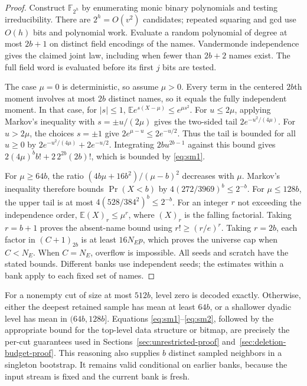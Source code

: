 \documentclass[11pt,letterpaper]{article}
\numberwithin{equation}{section}
\newcommand{\E}{\mathbb E}
\begin{document}
\begin{proof}
Construct $\mathbb F_{2^h}$ by enumerating monic binary polynomials and testing irreducibility.
There are $2^h=O(v^2)$ candidates; repeated squaring and gcd use $O(h)$ bits and polynomial work.
Evaluate a random polynomial of degree at most $2b+1$ on distinct field encodings of the names.
Vandermonde independence gives the claimed joint law, including when fewer than $2b+2$ names exist.
The full field word is evaluated before its first $j$ bits are tested.

The case $\mu=0$ is deterministic, so assume $\mu>0$.
Every term in the centered $2b$th moment involves at most $2b$ distinct names, so it equals the fully independent moment.
In that case, for $|s|\le1$, $\E e^{s(X-\mu)}\le e^{\mu s^2}$.
For $u\le2\mu$, applying Markov's inequality with $s=\pm u/(2\mu)$ gives the two-sided tail $2e^{-u^2/(4\mu)}$.
For $u>2\mu$, the choices $s=\pm1$ give $2e^{\mu-u}\le2e^{-u/2}$.
Thus the tail is bounded for all $u\ge0$ by $2e^{-u^2/(4\mu)}+2e^{-u/2}$.
Integrating $2b u^{2b-1}$ against this bound gives $2(4\mu)^b b!+2\,2^{2b}(2b)!$, which is bounded by \eqref{eq:sm1}.

For $\mu\ge64b$, the ratio $(4b\mu+16b^2)/(\mu-b)^2$ decreases with $\mu$.
Markov's inequality therefore bounds $\Pr(X<b)$ by $4(272/3969)^b\le2^{-b}$.
For $\mu\le128b$, the upper tail is at most $4(528/384^2)^b\le2^{-b}$.
For an integer $r$ not exceeding the independence order, $\E(X)_r\le\mu^r$, where $(X)_r$ is the falling factorial.
Taking $r=b+1$ proves the absent-name bound using $r!\ge(r/e)^r$.
Taking $r=2b$, each factor in $(C+1)_{2b}$ is at least $16N_E p$, which proves the universe cap when $C<N_E$.
When $C=N_E$, overflow is impossible.
All seeds and scratch have the stated bounds.
Different banks use independent seeds; the estimates within a bank apply to each fixed set of names.
\end{proof}

For a nonempty cut of size at most $512b$, level zero is decoded exactly.
Otherwise, either the deepest retained sample has mean at least $64b$, or a shallower dyadic level has mean in $(64b,128b]$.
Equations \eqref{eq:sm1}--\eqref{eq:sm2}, followed by the appropriate bound for the top-level data structure or bitmap, are precisely the per-cut guarantees used in Sections~\ref{sec:unrestricted-proof} and~\ref{sec:deletion-budget-proof}.
This reasoning also supplies $b$ distinct sampled neighbors in a singleton bootstrap.
It remains valid conditional on earlier banks, because the input stream is fixed and the current bank is fresh.
\end{document}

